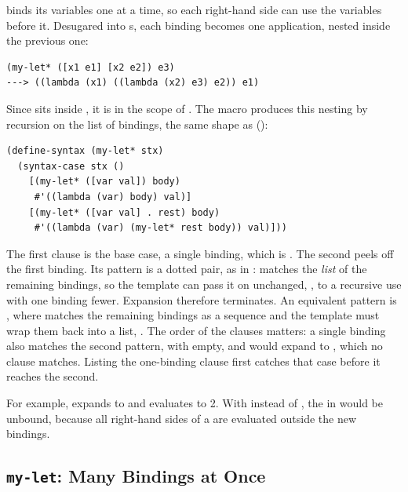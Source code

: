  binds its variables one at a time, so each right-hand side can use the variables before it. Desugared into s, each binding becomes one application, nested inside the previous one:
\begin{lstlisting}
(my-let* ([x1 e1] [x2 e2]) e3)
---> ((lambda (x1) ((lambda (x2) e3) e2)) e1)
\end{lstlisting}
Since  sits inside , it is in the scope of . The macro produces this nesting by recursion on the list of bindings, the same shape as  ():
\begin{lstlisting}
(define-syntax (my-let* stx)
  (syntax-case stx ()
    [(my-let* ([var val]) body)
     #'((lambda (var) body) val)]
    [(my-let* ([var val] . rest) body)
     #'((lambda (var) (my-let* rest body)) val)]))
\end{lstlisting}
The first clause is the base case, a single binding, which is . The second peels off the first binding. Its pattern  is a dotted pair, as in :  matches the \emph{list} of the remaining bindings, so the template can pass it on unchanged, , to a recursive use with one binding fewer. Expansion therefore terminates. An equivalent pattern is , where  matches the remaining bindings as a sequence and the template must wrap them back into a list, . The order of the clauses matters: a single binding also matches the second pattern, with  empty, and would expand to , which no clause matches. Listing the one-binding clause first catches that case before it reaches the second.

For example,  expands to  and evaluates to 2. With  instead of , the  in  would be unbound, because all right-hand sides of a  are evaluated outside the new bindings.

\subsection{\texttt{my-let}: Many Bindings at Once}

